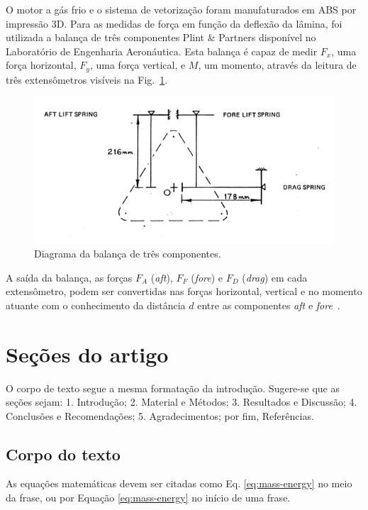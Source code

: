 \documentclass[
	article,			%
	10pt,				%
	oneside,			%
	a4paper,			%
  twocolumn,			%
	english,			%
	brazil,				%
	sumario=tradicional,
	]{abntex2}
\begin{document}
O motor a gás frio e o sistema de vetorização foram manufaturados em ABS por impressão 3D. Para as medidas de força em função da deflexão da lâmina, foi utilizada a balança de três componentes Plint \& Partners disponível no Laboratório de Engenharia Aeronáutica. Esta balança é capaz de medir \(F_x\), uma força horizontal, \(F_y\), uma força vertical, e \(M\), um momento, através da leitura de três extensômetros visíveis na Fig.~\ref{fig:diag_three_axis_scale}.

\begin{figure}[htbp]
  \centering
  \includegraphics[width=\linewidth]{../report/img/three_axis_scale_diagram.png}
  \caption{Diagrama da balança de três componentes.}
  \label{fig:diag_three_axis_scale}
\end{figure}

A saída da balança, as forças \(F_A\) (\textit{aft}), \(F_F\) (\textit{fore}) e \(F_D\) (\textit{drag}) em cada extensômetro, podem ser convertidas nas forças horizontal, vertical e no momento atuante com o conhecimento da distância \(d\) entre as componentes \textit{aft} e \textit{fore}~\cite{lab}.

\section{Seções do artigo}

O corpo de texto segue a mesma formatação da introdução. Sugere-se que as seções sejam: 1.
Introdução; 2. Material e Métodos; 3. Resultados e Discussão; 4. Conclusões e
Recomendações; 5. Agradecimentos; por fim, Referências.

\subsection{Corpo do texto}

As equações matemáticas devem ser citadas como Eq. \ref{eq:mass-energy} no meio da
frase, ou por Equação \ref{eq:mass-energy} no início de uma frase.
\end{document}
